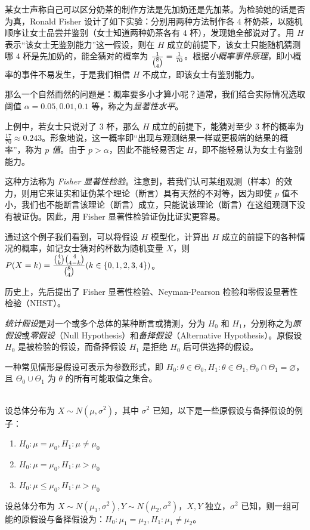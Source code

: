 \documentclass[../main.tex]{subfiles}
\begin{document}
\begin{example}
    某女士声称自己可以区分奶茶的制作方法是先加奶还是先加茶。为检验她的话是否为真，Ronald Fisher 设计了如下实验：分别用两种方法制作各 $4$ 杯奶茶，以随机顺序让女士品尝并鉴别（女士知道两种奶茶各有 $4$ 杯），发现她全部说对了。用 $H$ 表示“该女士无鉴别能力”这一假设，则在 $H$ 成立的前提下，该女士只能随机猜测哪 $4$ 杯是先加奶的，能全猜对的概率为 $\frac1{\tbinom 84}=\frac 1{70}$。根据\emph{小概率事件原理}，即小概率的事件不易发生，于是我们相信 $H$ 不成立，即该女士有鉴别能力。
\end{example}

那么一个自然而然的问题是：概率要多小才算小呢？通常，我们结合实际情况选取阈值 $\alpha=0.05,0.01,0.1$ 等，称之为\emph{显著性水平}。

上例中，若女士只说对了 $3$ 杯，那么 $H$ 成立的前提下，能猜对至少 $3$ 杯的概率为 $\frac{17}{70}\approx0.243$。形象地说，这一概率即“出现与观测结果一样或更极端的结果的概率”，称为 \emph{$p$ 值}。由于 $p>\alpha$，因此不能轻易否定 $H$，即不能轻易认为女士有鉴别能力。

这种方法称为 \emph{Fisher 显著性检验}。注意到，若我们认可某组观测（样本）的效力，则用它来证实和证伪某个理论（断言）具有天然的不对等，因为即使 $p$ 值不小，我们也不能断言该理论（断言）成立，只能说该理论（断言）在这组观测下没有被证伪。因此，用 Fisher 显著性检验证伪比证实更容易。

通过这个例子我们看到，可以将假设 $H$ 模型化，计算出 $H$ 成立的前提下的各种情况的概率，如记女士猜对的杯数为随机变量 $X$，则 $P(X=k)=\frac{\tbinom 4k\tbinom 4{4-k}}{\tbinom 84}(k\in\{0,1,2,3,4\})$。

历史上，先后提出了 Fisher 显著性检验、Neyman-Pearson 检验和零假设显著性检验（NHST）。

\emph{统计假设}是对一个或多个总体的某种断言或猜测，分为 $H_0$ 和 $H_1$，分别称之为\emph{原假设}或\emph{零假设}（Null Hypothesis）和\emph{备择假设}（Alternative Hypothesis）。原假设 $H_0$ 是被检验的假设，而备择假设 $H_1$ 是拒绝 $H_0$ 后可供选择的假设。

一种常见情形是假设可表示为参数形式，即 $H_0:\theta\in\Theta_0,H_1:\theta\in\Theta_1,\Theta_0\cap\Theta_1=\varnothing$，且 $\Theta_0\cup\Theta_1$ 为 $\theta$ 的所有可能取值之集合。

\begin{example}
    \mbox{}\\
    设总体分布为 $X\sim N(\mu,\sigma^2)$，其中 $\sigma^2$ 已知，以下是一些原假设与备择假设的例子：
    \begin{enumerate}
        \item $H_0:\mu=\mu_0,H_1:\mu\neq\mu_0$
        \item $H_0:\mu=\mu_0,H_1:\mu>\mu_0$
        \item $H_0:\mu\leq\mu_0,H_1:\mu>\mu_0$
    \end{enumerate}
    设总体分布为 $X\sim N(\mu_1,\sigma^2),Y\sim N(\mu_2,\sigma^2)$，$X,Y$ 独立，$\sigma^2$ 已知，则一组可能的原假设与备择假设为：$H_0:\mu_1=\mu_2,H_1:\mu_1\neq\mu_2$。
\end{example}
\end{document}

